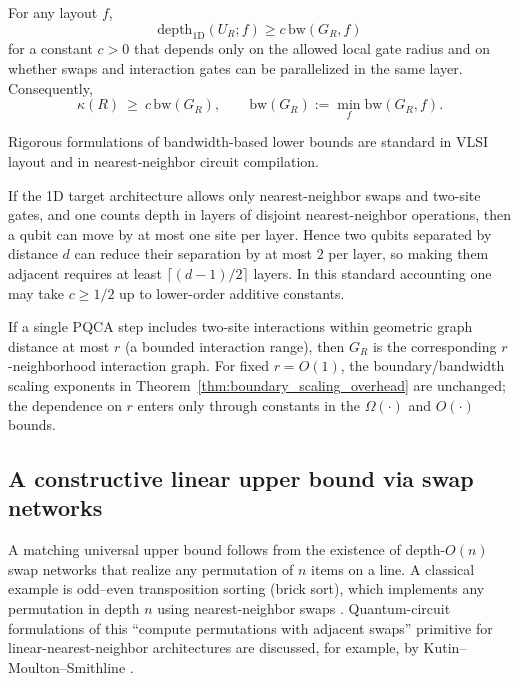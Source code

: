 \begin{proposition}
\label{prop:bandwidth_lower_bound}
For any layout $f$,
\begin{equation}
\mathrm{depth}_{\mathrm{1D}}(U_R;f) \ge c\,\mathrm{bw}(G_R,f)
\end{equation}
for a constant $c>0$ that depends only on the allowed local gate radius and on whether swaps and interaction gates can be parallelized in the same layer.
Consequently,
\begin{equation}
\kappa(R)\ \ge\ c\,\mathrm{bw}(G_R),\qquad \mathrm{bw}(G_R):=\min_f \mathrm{bw}(G_R,f).
\end{equation}
\end{proposition}

Rigorous formulations of bandwidth-based lower bounds are standard in VLSI layout and in nearest-neighbor circuit compilation.

\begin{remark}
If the 1D target architecture allows only nearest-neighbor swaps and two-site gates, and one counts depth in layers of disjoint nearest-neighbor operations, then a qubit can move by at most one site per layer.
Hence two qubits separated by distance $d$ can reduce their separation by at most $2$ per layer, so making them adjacent requires at least $\lceil(d-1)/2\rceil$ layers.
In this standard accounting one may take $c\ge 1/2$ up to lower-order additive constants.
\end{remark}

\begin{remark}
If a single PQCA step includes two-site interactions within geometric graph distance at most $r$ (a bounded interaction range), then $G_R$ is the corresponding $r$-neighborhood interaction graph.
For fixed $r=O(1)$, the boundary/bandwidth scaling exponents in Theorem~\ref{thm:boundary_scaling_overhead} are unchanged; the dependence on $r$ enters only through constants in the $\Omega(\cdot)$ and $O(\cdot)$ bounds.
\end{remark}

\subsection{A constructive linear upper bound via swap networks}
A matching universal upper bound follows from the existence of depth-$O(n)$ swap networks that realize any permutation of $n$ items on a line.
A classical example is odd--even transposition sorting (brick sort), which implements any permutation in depth $n$ using nearest-neighbor swaps \cite{Knuth1998}.
Quantum-circuit formulations of this ``compute permutations with adjacent swaps'' primitive for linear-nearest-neighbor architectures are discussed, for example, by Kutin--Moulton--Smithline \cite{Kutin2007}.

